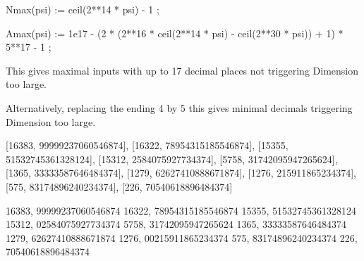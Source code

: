 


\xintdeffunc Nmax(psi) := ceil(2**14 * psi) - 1 ;

\xintdeffunc Amax(psi) := 1e17 - 
             (2 * (2**16 * ceil(2**14 * psi) - ceil(2**30 * psi)) + 1) * 5**17
                          - 1 ;


\immediate{}

\bye

This gives maximal inputs with up to 17 decimal places
not triggering Dimension too large.

Alternatively, replacing the ending 4 by 5 this gives
minimal decimals triggering Dimension too large.

[16383, 99999237060546874], [16322, 78954315185546874], [15355, 51532745361328124], [15312, 2584075927734374], [5758, 31742095947265624], [1365, 33333587646484374], [1279, 62627410888671874], [1276, 215911865234374], [575, 83174896240234374], [226, 70540618896484374]

16383, 99999237060546874
16322, 78954315185546874
15355, 51532745361328124
15312, 02584075927734374
 5758, 31742095947265624
 1365, 33333587646484374
 1279, 62627410888671874
 1276, 00215911865234374
  575, 83174896240234374
  226, 70540618896484374
